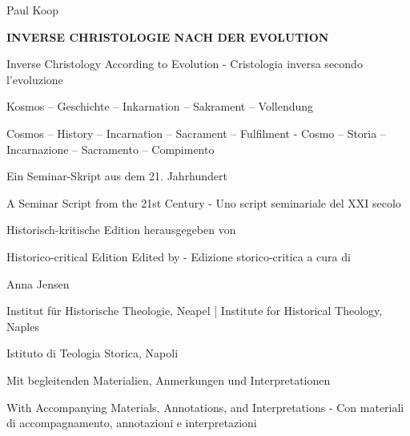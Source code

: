 \documentclass[
]{article}
\author{}
\date{}
\begin{document}
\begin{center}
\LARGE
Paul Koop

\vspace{1cm}

\Huge
\textbf{INVERSE CHRISTOLOGIE NACH DER EVOLUTION}

\vspace{0.5cm}
\Large
Inverse Christology According to Evolution - Cristologia inversa secondo l'evoluzione

\vspace{1cm}

\large
Kosmos -- Geschichte -- Inkarnation -- Sakrament -- Vollendung

\small
Cosmos -- History -- Incarnation -- Sacrament -- Fulfilment - Cosmo -- Storia -- Incarnazione -- Sacramento -- Compimento

\vspace{1.5cm}

\normalsize
Ein Seminar-Skript aus dem 21. Jahrhundert

\small
A Seminar Script from the 21st Century - Uno script seminariale del XXI secolo

\vspace{1.5cm}

\normalsize
Historisch-kritische Edition herausgegeben von

\small
Historico-critical Edition Edited by - Edizione storico-critica a cura di

\vspace{0.5cm}

\large
Anna Jensen

\normalsize
Institut für Historische Theologie, Neapel | Institute for Historical Theology, Naples

\small
Istituto di Teologia Storica, Napoli

\vspace{1cm}

\normalsize
Mit begleitenden Materialien, Anmerkungen und Interpretationen

\small
With Accompanying Materials, Annotations, and Interpretations - Con materiali di accompagnamento, annotazioni e interpretazioni

\end{center}

\newpage

{
\setcounter{tocdepth}{3}
\tableofcontents
}

\newpage
\end{document}
